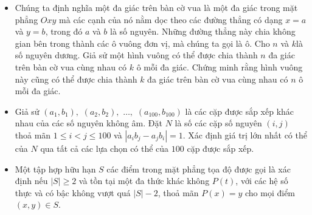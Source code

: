 \documentclass[11pt]{scrartcl}
\begin{document}
\begin{itemize}[label=, leftmargin=0em, itemsep=-0em]
    \item \begin{btvn}
        Chúng ta định nghĩa một đa giác trên bàn cờ vua là một đa giác trong mặt phẳng $Oxy$ mà các cạnh của nó nằm dọc theo các đường thẳng có dạng $x = a$ và $y = b$, trong đó $a$ và $b$ là số nguyên. Những đường thẳng này chia không gian bên trong thành các ô vuông đơn vị, mà chúng ta gọi là ô.
Cho $n$ và $k$là số nguyên dương. Giả sử một hình vuông có thể được chia thành $n$ đa giác trên bàn cờ vua cùng nhau có $k$ ô mỗi đa giác. Chứng minh rằng hình vuông này cũng có thể được chia thành $k$ đa giác trên bàn cờ vua cùng nhau có $n$ ô mỗi đa giác.
    \end{btvn}
    \item \begin{btvn}
        Giả sử $(a_1,b_1),$ $(a_2,b_2),$ $\dots,$ $(a_{100},b_{100})$ là các cặp được sắp xếp khác nhau của các số nguyên không âm. Đặt $N$ là số các cặp số nguyên $(i,j)$ thoả mãn $1\leq i<j\leq 100$ và $|a_ib_j-a_jb_i|=1$. Xác định giá trị lớn nhất có thể của $N$ qua tất cả các lựa chọn có thể của $100$ cặp được sắp xếp.
    \end{btvn}
    \item \begin{btvn}
        Một tập hợp hữu hạn $S$ các điểm trong mặt phẳng tọa độ được gọi là xác định nếu $|S|\ge 2$ và tồn tại một đa thức khác không $P(t)$, với các hệ số thực và có bậc không vượt quá $|S|-2$, thoả mãn $P(x)=y$ cho mọi điểm $(x,y)\in S$.


\end{btvn}
\end{itemize}
\end{document}
